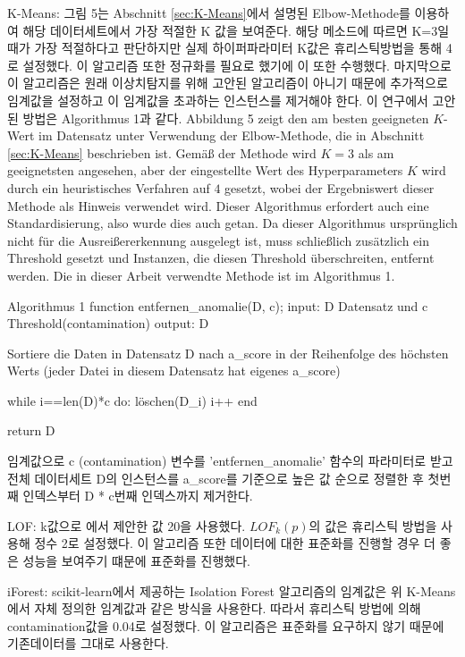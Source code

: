         K-Means: 그림 5는 Abschnitt \ref{sec:K-Means}에서 설명된 Elbow-Methode를 이용하여 해당 데이터세트에서 가장 적절한 K 값을 보여준다. 해당 메소드에 따르면 K=3일때가 가장 적절하다고 판단하지만 실제 하이퍼파라미터 K값은 휴리스틱방법을 통해 4로 설정했다. 이 알고리즘 또한 정규화를 필요로 했기에 이 또한 수행했다. 마지막으로 이 알고리즘은 원래 이상치탐지를 위해 고안된 알고리즘이 아니기 때문에 추가적으로 임계값을 설정하고 이 임계값을 초과하는 인스턴스를 제거해야 한다. 이 연구에서 고안된 방법은 Algorithmus 1과 같다.
        Abbildung 5 zeigt den am besten geeigneten $K$-Wert im Datensatz unter Verwendung der Elbow-Methode, die in Abschnitt \ref{sec:K-Means} beschrieben ist. Gemäß der Methode wird $K = 3$ als am geeignetsten angesehen, aber der eingestellte Wert des Hyperparameters $K$ wird durch ein heuristisches Verfahren auf $4$ gesetzt, wobei der Ergebniswert dieser Methode als Hinweis verwendet wird. Dieser Algorithmus erfordert auch eine Standardisierung, also wurde dies auch getan. Da dieser Algorithmus ursprünglich nicht für die Ausreißererkennung ausgelegt ist, muss schließlich zusätzlich ein Threshold gesetzt und Instanzen, die diesen Threshold überschreiten, entfernt werden. Die in dieser Arbeit verwendte Methode ist im Algorithmus 1.

        Algorithmus 1
        function entfernen_anomalie(D, c);
        input: D Datensatz und c Threshold(contamination)
        output: D

        Sortiere die Daten in Datensatz D nach a_score in der Reihenfolge des höchsten Werts
        (jeder Datei in diesem Datensatz hat eigenes a_score)

        while i==len(D)*c do:
            löschen(D_i)
            i++
        end

        return D

        임계값으로 c (contamination) 변수를 'entfernen_anomalie' 함수의 파라미터로 받고 전체 데이터세트 D의 인스턴스를 a_score를 기준으로 높은 값 순으로 정렬한 후 첫번째 인덱스부터 D * c번째 인덱스까지 제거한다.

        LOF: k값으로 \cite{Breunig00}에서 제안한 값 20을 사용했다. $LOF_k(p)$의 값은 휴리스틱 방법을 사용해 정수 2로 설정했다. 이 알고리즘 또한 데이터에 대한 표준화를 진행할 경우 더 좋은 성능을 보여주기 떄문에 표준화를 진행했다.

        iForest: scikit-learn에서 제공하는 Isolation Forest 알고리즘의 임계값은 위 K-Means에서 자체 정의한 임계값과 같은 방식을 사용한다. 따라서 휴리스틱 방법에 의해 contamination값을 0.04로 설정했다. 이 알고리즘은 표준화를 요구하지 않기 때문에 기존데이터를 그대로 사용한다.

